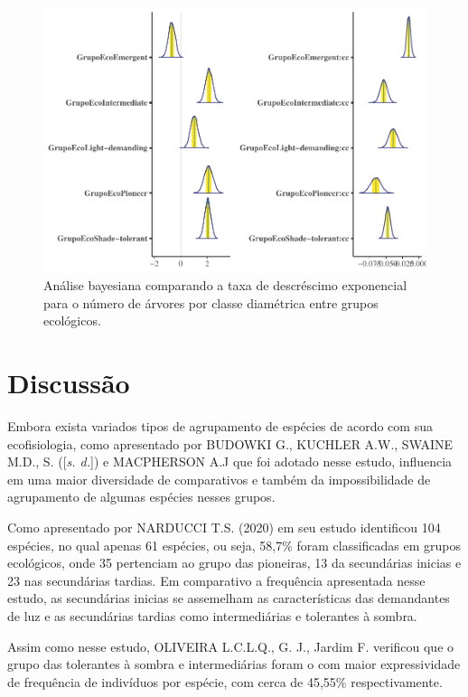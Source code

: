 \documentclass[
]{article}
\begin{document}
\begin{figure}
\centering
\includegraphics{manuscript_files/figure-latex/testeArvGrupoEco-1.pdf}
\caption{Análise bayesiana comparando a taxa de descréscimo exponencial
para o número de árvores por classe diamétrica entre grupos ecológicos.}
\end{figure}

\hypertarget{discussuxe3o}{%
\section{Discussão}\label{discussuxe3o}}

Embora exista variados tipos de agrupamento de espécies de acordo com
sua ecofisiologia, como apresentado por BUDOWKI G., KUCHLER A.W., SWAINE
M.D., S. ({[}\emph{s. d.}{]}) e MACPHERSON A.J que foi adotado nesse
estudo, influencia em uma maior diversidade de comparativos e também da
impossibilidade de agrupamento de algumas espécies nesses grupos.

Como apresentado por NARDUCCI T.S. (2020) em seu estudo identificou 104
espécies, no qual apenas 61 espécies, ou seja, 58,7\% foram
classificadas em grupos ecológicos, onde 35 pertenciam ao grupo das
pioneiras, 13 da secundárias inicias e 23 nas secundárias tardias. Em
comparativo a frequência apresentada nesse estudo, as secundárias
inicias se assemelham as características das demandantes de luz e as
secundárias tardias como intermediárias e tolerantes à sombra.

Assim como nesse estudo, OLIVEIRA L.C.L.Q., G. J., Jardim F. verificou
que o grupo das tolerantes à sombra e intermediárias foram o com maior
expressividade de frequência de indivíduos por espécie, com cerca de
45,55\% respectivamente.
\end{document}
